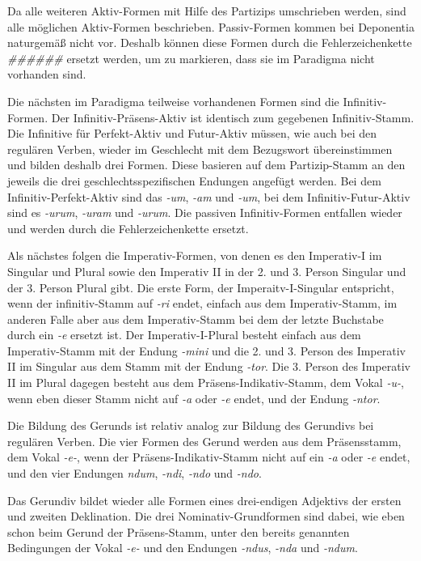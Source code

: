 \documentclass[12pt,abstract=on]{scrreprt}
\begin{document}
Da alle weiteren Aktiv-Formen mit Hilfe des Partizips umschrieben werden, sind alle möglichen Aktiv-Formen beschrieben. Passiv-Formen kommen bei Deponentia naturgemäß nicht vor. Deshalb können diese Formen durch die Fehlerzeichenkette \textit{\#\#\#\#\#\#} ersetzt werden, um zu markieren, dass sie im Paradigma nicht vorhanden sind. \par
Die nächsten im Paradigma teilweise vorhandenen Formen sind die Infinitiv-Formen. Der Infinitiv-Präsens-Aktiv ist identisch zum gegebenen Infinitiv-Stamm. Die Infinitive für Perfekt-Aktiv und Futur-Aktiv müssen, wie auch bei den regulären Verben, wieder im Geschlecht mit dem Bezugswort übereinstimmen und bilden deshalb drei Formen. Diese basieren auf dem Partizip-Stamm an den jeweils die drei geschlechtsspezifischen Endungen angefügt werden. Bei dem Infinitiv-Perfekt-Aktiv sind das \textit{-um}, \textit{-am} und \textit{-um}, bei dem Infinitiv-Futur-Aktiv sind es \textit{-urum}, \textit{-uram} und \textit{-urum}. Die passiven Infinitiv-Formen entfallen wieder und werden durch die Fehlerzeichenkette ersetzt. \par
Als nächstes folgen die Imperativ-Formen, von denen es den Imperativ-I im Singular und Plural sowie den Imperativ II in der 2. und 3. Person Singular und der 3. Person Plural gibt. Die erste Form, der Imperaitv-I-Singular entspricht, wenn der infinitiv-Stamm auf \textit{-ri} endet, einfach aus dem Imperativ-Stamm, im anderen Falle aber aus dem Imperativ-Stamm bei dem der letzte Buchstabe durch ein \textit{-e} ersetzt ist. Der Imperativ-I-Plural besteht einfach aus dem Imperativ-Stamm mit der Endung \textit{-mini} und die 2. und 3. Person des Imperativ II im Singular aus dem Stamm mit der Endung \textit{-tor}. Die 3. Person des Imperativ II im Plural dagegen besteht aus dem Präsens-Indikativ-Stamm, dem Vokal \textit{-u-}, wenn eben dieser Stamm nicht auf \textit{-a} oder \textit{-e} endet, und der Endung \textit{-ntor}. \par
Die Bildung des Gerunds ist relativ analog zur Bildung des Gerundivs bei regulären Verben. Die vier Formen des Gerund werden aus dem Präsensstamm, dem Vokal \textit{-e-}, wenn der Präsens-Indikativ-Stamm nicht auf ein \textit{-a} oder \textit{-e} endet, und den vier Endungen \textit{ndum}, \textit{-ndi}, \textit{-ndo} und \textit{-ndo}. \par
Das Gerundiv bildet wieder alle Formen eines drei-endigen Adjektivs der ersten und zweiten Deklination. Die drei Nominativ-Grundformen sind dabei, wie eben schon beim Gerund der Präsens-Stamm, unter den bereits genannten Bedingungen der Vokal \textit{-e-} und den Endungen \textit{-ndus}, \textit{-nda} und \textit{-ndum}. \par
\end{document}
